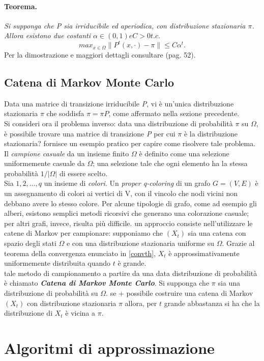 \paragraph{Teorema.} \textit{Si supponga che P sia irriducibile ed aperiodica, con distribuzione stazionaria $\pi$. Allora esistono due costanti $\alpha \in (0,1) e C > 0 t.c.$}
\begin{equation}
	max_{x\in\Omega}\|P^t(x,\cdot) - \pi\| \leq C\alpha^t.
	\label{convth}
\end{equation}
Per la dimostrazione e maggiori dettagli consultare \cite{levin2009markov} (pag. 52).
\subsection{Catena di Markov Monte Carlo}
Data una matrice di transizione irriducibile \textit{P}, vi è un'unica distribuzione stazionaria $\pi$ che soddisfa $\pi = \pi P$, come affermato nella sezione precedente.\\
Si consideri ora il problema inverso: data una distribuzione di probabilità $\pi$ su $\Omega$, è possibile trovare una matrice di transizione \textit{P} per cui $\pi$ è la distribuzione stazionaria? \cite{levin2009markov} fornisce un esempio pratico per capire come risolvere tale problema.\\
Il \textit{campione casuale} da un insieme finito $\Omega$ è definito come una selezione uniformemente casuale da $\Omega$; una selezione tale che ogni elemento ha la stessa probabilità $1/|\Omega|$ di essere scelto.\\
Sia ${1, 2, \dots, q}$ un insieme di \textit{colori}. Un \textit{proper q-coloring} di un grafo $G=(V, E)$ è un assegnamento di colori ai vertici di V, con il vincolo che nodi vicini non debbano avere lo stesso colore. Per alcune tipologie di grafo, come ad esempio gli alberi, esistono semplici metodi ricorsivi che generano una colorazione casuale; per altri grafi, invece, risulta più difficile. un approccio consiste nell'utilizzare le catene di Markov per campionare: supponiamo che $(X_t)$ sia una catena con spazio degli stati $\Omega$ e con una distribuzione stazionaria uniforme su $\Omega$. Grazie al teorema della convergenza enunciato in \ref{convth}, $X_t$ è approssimativamente uniformemente distribuita quando $t$ è grande.\\
tale metodo di campionamento a partire da una data distribuzione di probabilità è chiamato \textit{\textbf{Catena di Markov Monte Carlo}}. Si supponga che $\pi$ sia una distribuzione di probabilità su $\Omega$. se + possibile costruire una catena di Markov $(X_t)$ con distribuzione stazionaria $\pi$ allora, per $t$ grande abbastanza si ha che la distribuzione di $X_t$ è vicina a $\pi$.
\section{Algoritmi di approssimazione}
